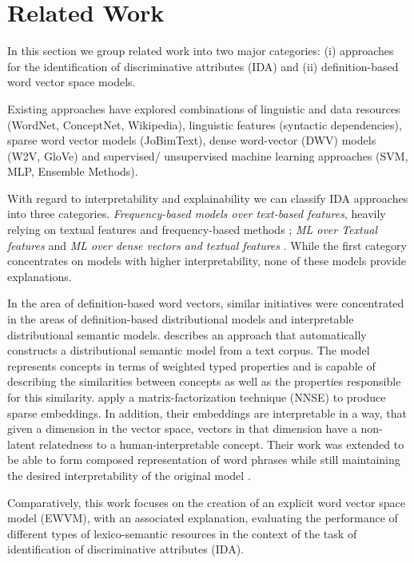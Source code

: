 \documentclass[11pt,a4paper]{article}
\begin{document}
\section{Related Work}
\label{sec:relatedWork}

In this section we group related work into two major categories: (i) approaches for the identification of discriminative attributes  (IDA) and (ii) definition-based word vector space models.

Existing approaches have explored combinations of linguistic and data resources (WordNet, ConceptNet, Wikipedia), linguistic features (syntactic dependencies), sparse word vector models (JoBimText), dense word-vector (DWV) models (W2V, GloVe) and supervised/ unsupervised machine learning approaches (SVM, MLP, Ensemble Methods).

With regard to interpretability and explainability we can classify IDA approaches into three categories. \textit{Frequency-based models over text-based features}, heavily relying on textual features and frequency-based methods \cite{citiusnlp, elirfupv} ; \textit{ML over Textual features} \cite{alb, meaningspace, unbnlp, abdn} and \textit{ML over dense vectors and textual features} \cite{uwb, ghh, thungn, alb,unam, luminoso, bomji, igevorse, ecnu, amritanlp, discriminator, umd, ntunlp}. While the first category concentrates on models with higher interpretability, none of these models provide explanations.

In the area of definition-based word vectors, similar initiatives were concentrated in the areas of definition-based distributional models and interpretable distributional semantic models.  \citet{baroni2010strudel} describes an approach that automatically constructs a distributional semantic model from a text corpus. The model represents concepts in terms of weighted typed properties and is capable of describing the similarities between concepts as well as the properties responsible for this similarity. \citet{murphy2012learning} apply a matrix-factorization technique (NNSE) to produce sparse embeddings. In addition, their embeddings are interpretable in a way, that given a dimension in the vector space, vectors in that dimension have a non-latent relatedness to a human-interpretable concept. Their work was extended to be able to form composed representation of word phrases while still maintaining the desired interpretability of the original model \cite{fyshe2015compositional}. 

Comparatively, this work focuses on the creation of an explicit word vector space model (EWVM), with an associated explanation, evaluating the performance of different types of lexico-semantic resources in the context of the task of identification of discriminative attributes (IDA).
\end{document}

